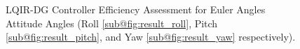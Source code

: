 \documentclass[3p,times]{elsarticle}
\begin{document}
\begin{figure}[H]
	\centering
	\hfil
	\caption{LQIR-DG Controller Efficiency Assessment for Euler Angles Attitude Angles (Roll \ref{sub@fig:result_roll}, Pitch \ref{sub@fig:result_pitch}, and Yaw \ref{sub@fig:result_yaw}    
	respectively).}
	\label{fig:result}
\end{figure}
\end{document}
